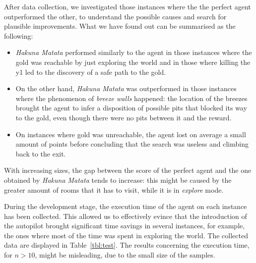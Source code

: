 \documentclass{llncs}
\newcommand{\hm}{\emph{Hakuna Matata}\xspace}
\begin{document}
After data collection, we investigated those instances where the the perfect agent outperformed the other, to understand the possible causes and search for plausible improvements.
What we have found out can be summarised as the following:
\begin{itemize}
	\item \hm performed similarly to the agent in those instances where the gold was reachable by just exploring the world and in those where killing the y1 led to the discovery of a safe path to the gold.
	\item On the other hand, \hm was outperformed in those instances where the phenomenon of \emph{breeze walls} happened: the location of the breezes brought the agent to infer a disposition of possible pits that blocked its way to the gold, even though there were no pits between it and the reward.
	\item On instances where gold was unreachable, the agent lost on average a small amount of points before concluding that the search was useless and climbing back to the exit.
\end{itemize}

With increasing sizes, the gap between the score of the perfect agent and the one obtained by \hm tends to increase: this might be caused by the greater amount of rooms that it has to visit, while it is in \emph{explore} mode.

During the development stage, the execution time of the agent on each instance has been collected.
This allowed us to effectively evince that the introduction of the autopilot brought significant time savings in several instances, for example, the ones where most of the time was spent in exploring the world.
The collected data are displayed in Table~\ref{tbl:test}.
The results concerning the execution time, for $n > 10$, might be misleading, due to the small size of the samples.

\end{document}
